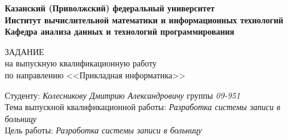 \documentclass[a4paper]{article}
\begin{document}
    \begin{center}
        {\bfseries Казанский (Приволжский) федеральный университет \\
        Институт вычислительной математики и информационных технологий \\
        Кафедра анализа данных и технологий программирования} \\
    \end{center}

    \begin{center}
        ЗАДАНИЕ \\
        на выпускную квалификационную работу \\
        по направлению <<Прикладная информатика>>
    \end{center}

    \begin{flushleft}
        Студенту: \emph{Колесникову Дмитрию Александровичу} группы \emph{09-951} \\
        Тема выпускной квалификационной работы: \emph{Разработка системы записи в больницу} \\
        Цель работы: \emph{Разработка системы записи в больницу}
    \end{flushleft}

    \vspace{-0.5cm}

    \vspace{5cm}
\end{document}
